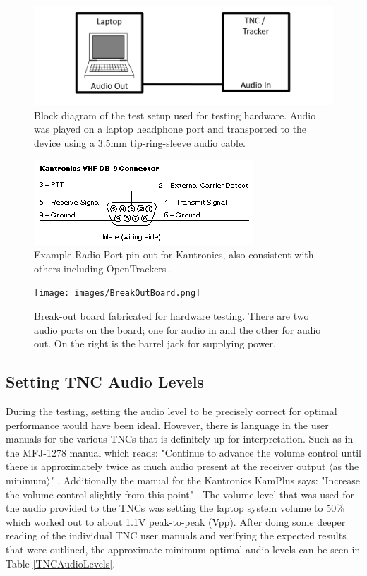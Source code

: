 \begin{figure}
  \centering
	\includegraphics[width=0.75\linewidth]{images/TNCLaptopTestSetup.PNG} 
	\caption{Block diagram of the test setup used for testing hardware. Audio was played on a laptop headphone port and transported to the device using a 3.5mm tip-ring-sleeve audio cable.}
   \label{TNCLaptopTestSetup}
\end{figure}
\begin{figure}
  \centering
	\includegraphics[width=0.75\linewidth]{images/RadioPortPinout.png} 
	\caption{Example Radio Port pin out for Kantronics, also consistent with others including OpenTrackers\,\cite{Martin2014}.}
   \label{RadioPortPinout}
\end{figure}
\begin{figure}
  \centering
	\texttt{[image: images/BreakOutBoard.png]} 
	\caption{Break-out board fabricated for hardware testing. There are two audio ports on the board; one for audio in and the other for audio out. On the right is the barrel jack for supplying power.}
   \label{BreakOutBoard}
\end{figure}

\subsection{Setting TNC Audio Levels}
During the testing, setting the audio level to be precisely correct for optimal performance would have been ideal. However, there is language in the user manuals for the various TNCs that is definitely up for interpretation. Such as in the MFJ-1278 manual which reads: "Continue to advance the volume control until there is approximately twice as much audio present at the receiver output $\langle$as the minimum$\rangle$" \cite{MFJ1278Man}. Additionally the manual for the Kantronics KamPlus says: "Increase the volume control slightly from this point" \cite{KamPlusGettingStarted}. The volume level that was used for the audio provided to the TNCs was setting the laptop system volume to 50\% which worked out to about 1.1V peak-to-peak (Vpp). After doing some deeper reading of the individual TNC user manuals and verifying the expected results that were outlined, the approximate minimum optimal audio levels can be seen in Table \ref{TNCAudioLevels}.


